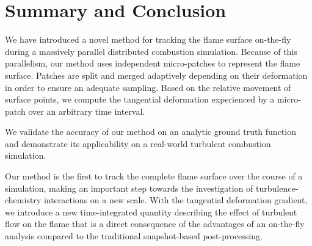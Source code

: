 
%
\section{Summary and Conclusion} %
\label{sec:fst_summary_and_conclusion}
%
We have introduced a novel method for tracking the flame surface on-the-fly
during a massively parallel distributed combustion simulation.
%
Because of this parallelism, our method uses independent micro-patches to
represent the flame surface.
%
Patches are split and merged adaptively depending on their deformation in order
to ensure an adequate sampling.
%
Based on the relative movement of surface points, we compute the tangential
deformation experienced by a micro-patch over an arbitrary time interval.
%

%
We validate the accuracy of our method on an analytic ground truth function
and demonstrate its applicability on a real-world turbulent combustion
simulation.
%

%
Our method is the first to track the complete flame surface over the course of a
simulation, making an important step towards the investigation of
turbulence-chemistry interactions on a new scale.
%
With the tangential deformation gradient, we introduce a new time-integrated
quantity describing the effect of turbulent flow on the flame that is a direct
consequence of the advantages of an on-the-fly analysis compared to the
traditional snapshot-based post-processing.
%

